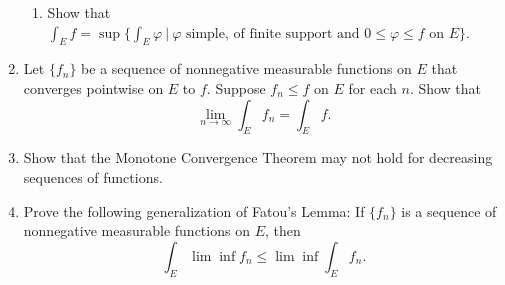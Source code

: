\begin{enumerate}
\begin{enumerate}[label=(\roman*),align=left]
        \item Show that $\int_Ef=\sup\{\int_E\varphi\ |\ \varphi\text{ simple, of finite support and }0\le\varphi\le f\text{ on }E\}$.
    \end{enumerate}
    \item Let $\{f_n\}$ be a sequence of nonnegative measurable functions on $E$ that converges pointwise on $E$ to $f$. Suppose $f_n\le f$ on $E$ for each $n$. Show that
    \[
        \lim_{n\to\infty}\int_Ef_n=\int_Ef.
    \]
    \item Show that the Monotone Convergence Theorem may not hold for decreasing sequences of functions.
    \item Prove the following generalization of Fatou's Lemma: If $\{f_n\}$ is a sequence of nonnegative measurable functions on $E$, then 
    \[
    \int_E\lim\inf f_n\le\lim\inf\int_Ef_n.     
    \]
\end{enumerate}
    
